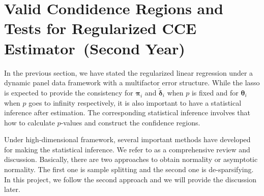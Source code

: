 \documentclass[11pt,a4paper]{article}
\newcommand{\Bdelta}{\boldsymbol{\delta}}
\newcommand{\Btheta}{\boldsymbol{\theta}}
\newcommand{\Bpi}{\boldsymbol{\pi}}
\theoremstyle{definition}
\begin{document}
\section{Valid Condidence Regions and Tests for Regularized CCE Estimator~(Second Year)}\label{Sec:plan2}

In the previous section, we have stated the regularized linear regression under a dynamic panel data framework with a multifactor error structure. While the lasso is expected to provide the consistency for $\Bpi_i$ and $\tilde{\Bdelta}_i$ when $p$ is fixed and for $\Btheta_i$ when $p$ goes to infinity respectively, it is also important to have a statistical inference after estimation.  The corresponding statistical inference involves that how to calculate $p$-values and construct the confidence regions. 

Under high-dimensional framework, several important methods have developed for making the statistical inference. We refer to \citet{Dezeure2015} as a comprehensive review and discussion. Basically, there are two approaches to obtain normality or asymptotic normality. The first one is sample splitting and the second one is de-sparsifying. In this project, we follow the second approach and we will provide the discussion later.
\end{document}
